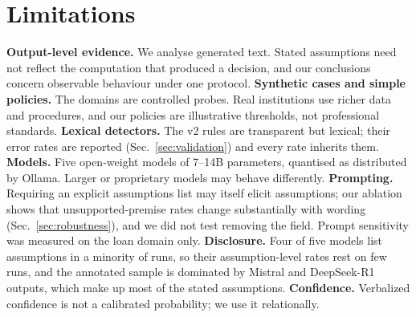 \section{Limitations}
\textbf{Output-level evidence.} We analyse generated text. Stated assumptions need not reflect the computation that produced a decision, and our conclusions concern observable behaviour under one protocol.
\textbf{Synthetic cases and simple policies.} The domains are controlled probes. Real institutions use richer data and procedures, and our policies are illustrative thresholds, not professional standards.
\textbf{Lexical detectors.} The v2 rules are transparent but lexical; their error rates are reported (Sec.~\ref{sec:validation}) and every rate inherits them.
\textbf{Models.} Five open-weight models of 7--14B parameters, quantised as distributed by Ollama. Larger or proprietary models may behave differently.
\textbf{Prompting.} Requiring an explicit assumptions list may itself elicit assumptions; our ablation shows that unsupported-premise rates change substantially with wording (Sec.~\ref{sec:robustness}), and we did not test removing the field. Prompt sensitivity was measured on the loan domain only.
\textbf{Disclosure.} Four of five models list assumptions in a minority of runs, so their assumption-level rates rest on few runs, and the annotated sample is dominated by Mistral and DeepSeek-R1 outputs, which make up most of the stated assumptions.
\textbf{Confidence.} Verbalized confidence is not a calibrated probability; we use it relationally.
